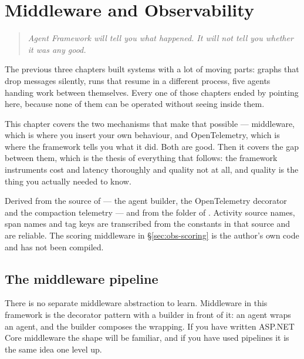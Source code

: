 \chapter{Middleware and Observability}
\label{ch:observability}

\begin{quote}\itshape
Agent Framework will tell you what happened. It will not tell you whether it was
any good.
\end{quote}

\noindent
The previous three chapters built systems with a lot of moving parts: graphs that
drop messages silently, runs that resume in a different process, five agents
handing work between themselves. Every one of those chapters ended by pointing
here, because none of them can be operated without seeing inside them.

This chapter covers the two mechanisms that make that possible --- middleware,
which is where you insert your own behaviour, and OpenTelemetry, which is where
the framework tells you what it did. Both are good. Then it covers the gap
between them, which is the thesis of everything that follows: the framework
instruments cost and latency thoroughly and quality not at all, and quality is
the thing you actually needed to know.

\begin{verifybox}
Derived from the source of  --- the agent builder,
the OpenTelemetry decorator and the compaction telemetry --- and from the
 folder of . Activity
source names, span names and tag keys are transcribed from the constants in that
source and are reliable. The scoring middleware in \S\ref{sec:obs-scoring} is the
author's own code and has not been compiled.
\end{verifybox}

\section{The middleware pipeline}
\label{sec:obs-middleware}

There is no separate middleware abstraction to learn. Middleware in this
framework is the decorator pattern with a builder in front of it: an agent wraps
an agent, and the builder composes the wrapping. If you have written ASP.NET Core
middleware the shape will be familiar, and if you have used
 pipelines it is the same idea one level up.

